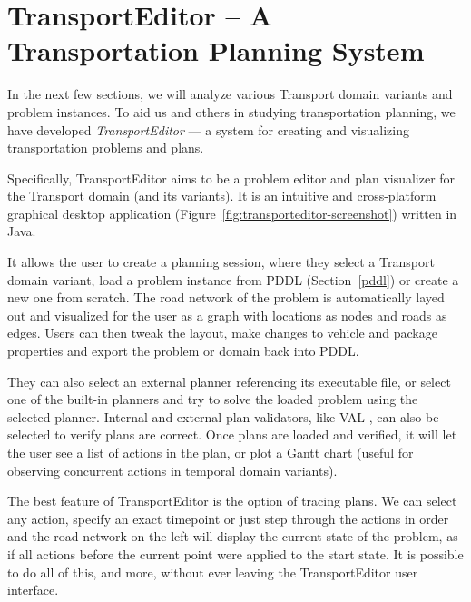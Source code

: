 











\section{TransportEditor -- A Transportation Planning System}

In the next few sections, we will analyze various Transport domain variants and problem
instances. To aid us and others in studying transportation planning,
we have developed \textit{TransportEditor} --- a system for creating and visualizing transportation problems and plans.

Specifically, TransportEditor aims to be a problem editor and plan visualizer for the Transport domain (and its variants). It is an intuitive and cross-platform graphical desktop application (Figure~\ref{fig:transporteditor-screenshot})
written in Java.

It allows the user to create a planning session, where they
select a Transport domain variant, load a problem instance from PDDL (Section~\ref{pddl}) or create a new one from scratch.
The road network of the problem is automatically layed out and visualized for the user as a graph with locations as nodes and roads as edges.
Users can then tweak the layout, make changes to vehicle and package properties
and export the problem or domain back into PDDL.

They can also select an external planner
referencing its executable file, or select one of the built-in planners and try to solve
the loaded problem using the selected planner. Internal and external plan validators, like VAL \citep{Howey2003}, can also be selected to verify plans are correct.
Once plans are loaded and verified, it will let the user see a list of actions
in the plan, or plot a Gantt chart (useful for observing concurrent actions in temporal domain variants).

The best feature of TransportEditor is the option of tracing plans. We can select
any action, specify an exact timepoint or just step through the actions in order and
the road network on the left will display the current state of the problem, as if
all actions before the current point were applied to the start state.
It is possible to do all of this, and more, without ever leaving the TransportEditor user interface.

